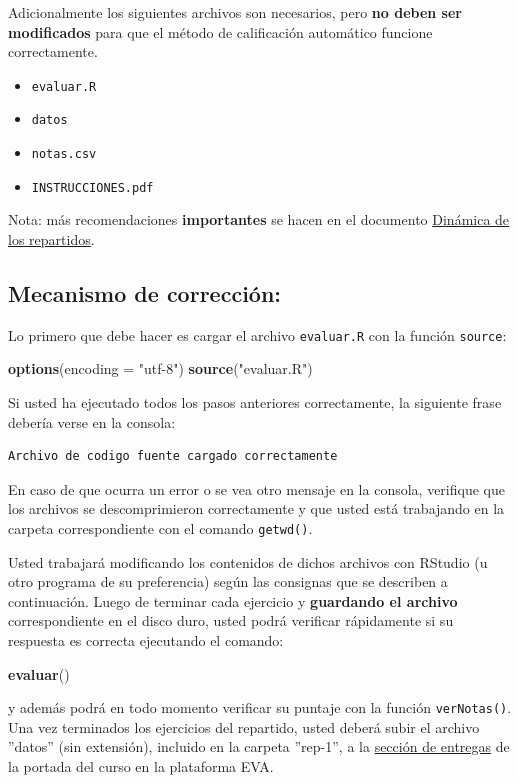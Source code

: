 \documentclass[]{article}
\newenvironment{Shaded}{}{}
\newcommand{\KeywordTok}[1]{\textcolor[rgb]{0.00,0.44,0.13}{\textbf{{#1}}}}
\newcommand{\DataTypeTok}[1]{\textcolor[rgb]{0.56,0.13,0.00}{{#1}}}
\newcommand{\StringTok}[1]{\textcolor[rgb]{0.25,0.44,0.63}{{#1}}}
\newcommand{\NormalTok}[1]{{#1}}
\begin{document}
Adicionalmente los siguientes archivos son necesarios, pero \textbf{no
deben ser modificados} para que el método de calificación automático
funcione correctamente.

\begin{itemize}
\item
  \texttt{evaluar.R}
\item
  \texttt{datos}
\item
  \texttt{notas.csv}
\item
  \texttt{INSTRUCCIONES.pdf}
\end{itemize}
Nota: más recomendaciones \textbf{importantes} se hacen en el documento
\href{http://eva.universidad.edu.uy/mod/resource/view.php?id=118422}{Dinámica
de los repartidos}.

\subsection{Mecanismo de corrección:}

Lo primero que debe hacer es cargar el archivo \texttt{evaluar.R} con la
función \texttt{source}:

\begin{Shaded}
\begin{Highlighting}[]
\KeywordTok{options}\NormalTok{(}\DataTypeTok{encoding =} \StringTok{"utf-8"}\NormalTok{)}
\KeywordTok{source}\NormalTok{(}\StringTok{"evaluar.R"}\NormalTok{)}
\end{Highlighting}
\end{Shaded}
Si usted ha ejecutado todos los pasos anteriores correctamente, la
siguiente frase debería verse en la consola:

\begin{verbatim}
Archivo de codigo fuente cargado correctamente
\end{verbatim}
En caso de que ocurra un error o se vea otro mensaje en la consola,
verifique que los archivos se descomprimieron correctamente y que usted
está trabajando en la carpeta correspondiente con el comando
\texttt{getwd()}.

Usted trabajará modificando los contenidos de dichos archivos con
RStudio (u otro programa de su preferencia) según las consignas que se
describen a continuación. Luego de terminar cada ejercicio y
\textbf{guardando el archivo} correspondiente en el disco duro, usted
podrá verificar rápidamente si su respuesta es correcta ejecutando el
comando:

\begin{Shaded}
\begin{Highlighting}[]
\KeywordTok{evaluar}\NormalTok{()}
\end{Highlighting}
\end{Shaded}
y además podrá en todo momento verificar su puntaje con la función
\texttt{verNotas()}. Una vez terminados los ejercicios del repartido,
usted deberá subir el archivo ''datos'' (sin extensión), incluido en la
carpeta ''rep-1'', a la
\href{http://eva.universidad.edu.uy/mod/assignment/view.php?id=93616}{sección
de entregas} de la portada del curso en la plataforma EVA.
\end{document}
